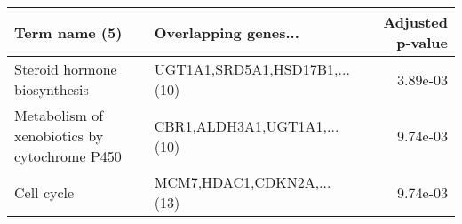 \begin{tabular}{llr}
\toprule
                               Term name (5) &          Overlapping genes... &  Adjusted p-value \\
\midrule
                Steroid hormone biosynthesis & UGT1A1,SRD5A1,HSD17B1,...(10) &          3.89e-03 \\
Metabolism of xenobiotics by cytochrome P450 &   CBR1,ALDH3A1,UGT1A1,...(10) &          9.74e-03 \\
                                  Cell cycle &     MCM7,HDAC1,CDKN2A,...(13) &          9.74e-03 \\
\bottomrule
\end{tabular}

